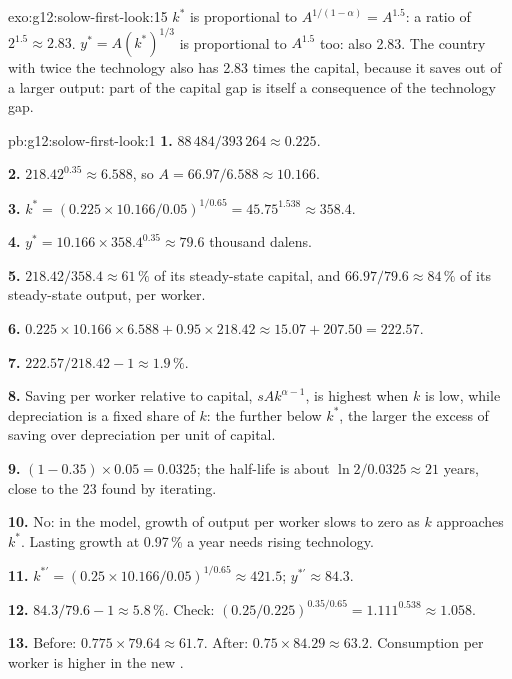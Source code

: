 \begin{solution}{exo:g12:solow-first-look:15}
$k^*$ is proportional to $A^{1/(1 - \alpha)} = A^{1.5}$: a ratio of $2^{1.5} \approx 2.83$. $y^* = A(k^*)^{1/3}$ is proportional to $A^{1.5}$ too: also 2.83. The country with
twice the technology also has 2.83 times the capital, because it saves out of a larger output: part of the capital gap is itself a consequence of the technology gap.
\end{solution}

\begin{solution}{pb:g12:solow-first-look:1}
\textbf{1.} $88\,484/393\,264 \approx 0.225$.

\textbf{2.} $218.42^{0.35} \approx 6.588$, so $A = 66.97/6.588 \approx 10.166$.

\textbf{3.} $k^* = (0.225 \times 10.166/0.05)^{1/0.65} = 45.75^{1.538} \approx 358.4$.

\textbf{4.} $y^* = 10.166 \times 358.4^{0.35} \approx 79.6$ thousand dalens.

\textbf{5.} $218.42/358.4 \approx 61\,\%$ of its steady-state capital, and $66.97/79.6 \approx 84\,\%$ of its steady-state output, per worker.

\textbf{6.} $0.225 \times 10.166 \times 6.588 + 0.95 \times 218.42 \approx 15.07 + 207.50 = 222.57$.

\textbf{7.} $222.57/218.42 - 1 \approx 1.9\,\%$.

\textbf{8.} Saving per worker relative to capital, $sAk^{\alpha - 1}$, is highest when $k$ is low, while depreciation is a fixed share of $k$: the further below $k^*$, the
larger the excess of saving over depreciation per unit of capital.

\textbf{9.} $(1 - 0.35) \times 0.05 = 0.0325$; the half-life is about $\ln 2/0.0325 \approx 21$ years, close to the 23 found by iterating.

\textbf{10.} No: in the model, growth of output per worker slows to zero as $k$ approaches $k^*$. Lasting growth at 0.97\,\% a year needs rising technology.

\textbf{11.} $k^{*\prime} = (0.25 \times 10.166/0.05)^{1/0.65} \approx 421.5$; $y^{*\prime} \approx 84.3$.

\textbf{12.} $84.3/79.6 - 1 \approx 5.8\,\%$. Check: $(0.25/0.225)^{0.35/0.65} = 1.111^{0.538} \approx 1.058$.

\textbf{13.} Before: $0.775 \times 79.64 \approx 61.7$. After: $0.75 \times 84.29 \approx 63.2$. Consumption per worker is higher in the new .


\end{solution}
